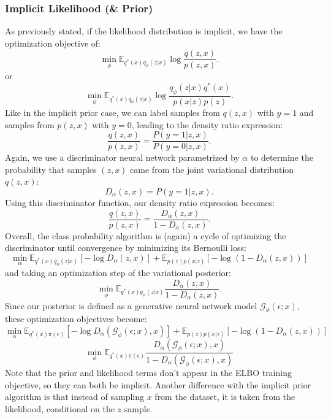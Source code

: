 \documentclass[a4paper,12pt]{article}
\numberwithin{equation}{section}
\begin{document}
\subsubsection{Implicit Likelihood (\& Prior)}
As previously stated, if the likelihood distribution is implicit, we have the optimization objective of:
\[\min_\phi \mathbb{E}_{q^*(x)q_\phi(z|x)}\log \frac{q(z,x)}{p(z,x)}.\]
or
\[\min_\phi \mathbb{E}_{q^*(x)q_\phi(z|x)}\log \frac{q_\phi(z|x)q^*(x)}{p(x|z)p(z)}.\]
Like in the implicit prior case, we can label samples from $q(z,x)$ with $y=1$ and samples from $p(z,x)$ with $y=0$, leading to the density ratio expression:
\[\frac{q(z,x)}{p(z,x)}=\frac{P(y=1|z,x)}{P(y=0|z,x)}.\]
Again, we use a discriminator neural network parametrized by $\alpha$ to determine the probability that samples $(z,x)$ came from the joint variational distribution $q(z,x)$:
\[D_\alpha(z,x)=P(y=1|z,x).\]
Using this discriminator function, our density ratio expression becomes:
\[\frac{q(z,x)}{p(z,x)}=\frac{D_\alpha(z,x)}{1-D_\alpha(z,x)}.\]
Overall, the class probability algorithm is (again) a cycle of optimizing the discriminator until convergence by minimizing its Bernoulli loss:
\[\min_\alpha \mathbb{E}_{q^*(x)q_\phi(z|x)}[-\log D_\alpha(z,x)]+\mathbb{E}_{p(z)p(x|z)}[-\log (1-D_\alpha(z,x))]\]
and taking an optimization step of the variational posterior:
\[\min_\phi \mathbb{E}_{q^*(x)q_\phi(z|x)}\frac{D_\alpha(z,x)}{1-D_\alpha(z,x)}.\]
Since our posterior is defined as a generative neural network model $\mathcal{G}_\phi (\epsilon;x)$, these optimization objectives become:
\[\min_\alpha \mathbb{E}_{q^*(x)\pi(\epsilon)}[-\log D_\alpha(\mathcal{G}_\phi(\epsilon;x), x)]+\mathbb{E}_{p(z)p(x|z)}[-\log (1-D_\alpha(z,x))]\]
\[\min_\phi \mathbb{E}_{q^*(x)\pi(\epsilon)}\frac{D_\alpha(\mathcal{G}_\phi(\epsilon;x),x)}{1-D_\alpha(\mathcal{G}_\phi(\epsilon;x),x)}\]
Note that the prior and likelihood terms don't appear in the ELBO training objective, so they can both be implicit. Another difference with the implicit prior algorithm is that instead of sampling $x$ from the dataset, it is taken from the likelihood, conditional on the $z$ sample.
\newpage
\end{document}
